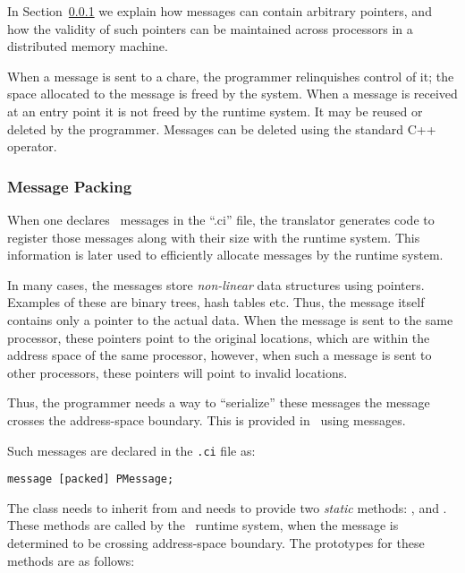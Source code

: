 In Section~\ref{message packing} we explain how messages can
contain arbitrary pointers, and how the validity of such pointers can be
maintained across processors in a distributed memory machine.

When a message  is sent to a chare, the programmer
relinquishes control of it; the space allocated to the message is
freed by the system.  When a message is received at an entry point it
is not freed by the runtime system.  It may be reused or deleted by
the programmer.  Messages can be deleted using the standard C++
 operator.  


\subsubsection{Message Packing}
\label{message packing}

When one declares \charmpp\ messages in the ``.ci'' file, the
translator generates code to register those messages along with their
size with the runtime system. This information is later used to
efficiently allocate messages by the runtime system.

In many cases, the messages store {\em non-linear} data structures
using pointers.  Examples of these are binary trees, hash tables
etc. Thus, the message itself contains only a pointer to the actual
data. When the message is sent to the same processor, these pointers
point to the original locations, which are within the address space of
the same processor, however, when such a message is sent to other
processors, these pointers will point to invalid locations.

Thus, the programmer needs a way to ``serialize'' these messages
 the message crosses the address-space boundary. This is
provided in \charmpp\ using
  messages.

Such messages are declared in the {\tt .ci} file as:

\verb+message [packed] PMessage;+

The class  needs to inherit from 
and needs to provide two {\em static} methods: , 
and . These methods are called by the
\charmpp\ runtime system, when the message is determined to be
crossing address-space boundary. The prototypes for these methods are
as follows:

